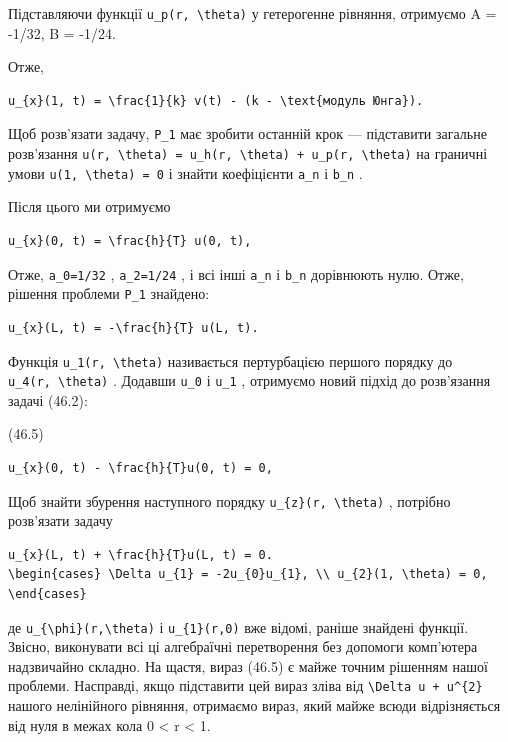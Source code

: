 \documentclass[
  ukrainian,
]{article}
\begin{document}
Підставляючи функції \texttt{u\_p(r,\ \textbackslash{}theta)} у
гетерогенне рівняння, отримуємо A = -1/32, B = -1/24.

Отже,

\begin{verbatim}
u_{x}(1, t) = \frac{1}{k} v(t) - (k - \text{модуль Юнга}).
\end{verbatim}

Щоб розв'язати задачу, \texttt{P\_1} має зробити останній крок ---
підставити загальне розв'язання
\texttt{u(r,\ \textbackslash{}theta)\ =\ u\_h(r,\ \textbackslash{}theta)\ +\ u\_p(r,\ \textbackslash{}theta)}
на граничні умови \texttt{u(1,\ \textbackslash{}theta)\ =\ 0} і знайти
коефіцієнти \texttt{a\_n} і \texttt{b\_n} .

Після цього ми отримуємо

\begin{verbatim}
u_{x}(0, t) = \frac{h}{T} u(0, t),
\end{verbatim}

Отже, \texttt{a\_0=1/32} , \texttt{a\_2=1/24} , і всі інші \texttt{a\_n}
і \texttt{b\_n} дорівнюють нулю. Отже, рішення проблеми \texttt{P\_1}
знайдено:

\begin{verbatim}
u_{x}(L, t) = -\frac{h}{T} u(L, t).
\end{verbatim}

Функція \texttt{u\_1(r,\ \textbackslash{}theta)} називається
пертурбацією першого порядку до \texttt{u\_4(r,\ \textbackslash{}theta)}
. Додавши \texttt{u\_0} і \texttt{u\_1} , отримуємо новий підхід до
розв'язання задачі (46.2):

(46.5)

\begin{verbatim}
u_{x}(0, t) - \frac{h}{T}u(0, t) = 0,
\end{verbatim}

Щоб знайти збурення наступного порядку
\texttt{u\_\{z\}(r,\ \textbackslash{}theta)} , потрібно розв'язати
задачу

\begin{verbatim}
u_{x}(L, t) + \frac{h}{T}u(L, t) = 0.
\begin{cases} \Delta u_{1} = -2u_{0}u_{1}, \\ u_{2}(1, \theta) = 0, \end{cases}
\end{verbatim}

де \texttt{u\_\{\textbackslash{}phi\}(r,\textbackslash{}theta)} і
\texttt{u\_\{1\}(r,0)} вже відомі, раніше знайдені функції. Звісно,
виконувати всі ці алгебраїчні перетворення без допомоги комп'ютера
надзвичайно складно. На щастя, вираз (46.5) є майже точним рішенням
нашої проблеми. Насправді, якщо підставити цей вираз зліва від
\texttt{\textbackslash{}Delta\ u\ +\ u\^{}\{2\}} нашого нелінійного
рівняння, отримаємо вираз, який майже всюди відрізняється від нуля в
межах кола 0 \textless{} r \textless{} 1.
\end{document}
